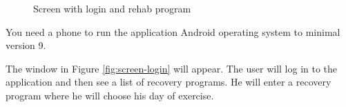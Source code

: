 \begin{figure}[!htb]
  \centering
  \hfill
    
    \caption{Screen with login and rehab program}
\end{figure}

You need a phone to run the application
Android operating system to minimal version 9.

The window in Figure \ref{fig:screen-login} will appear.
The user will log in to the application and then see a list of recovery programs.
He will enter a recovery program where he will choose his day of exercise.

